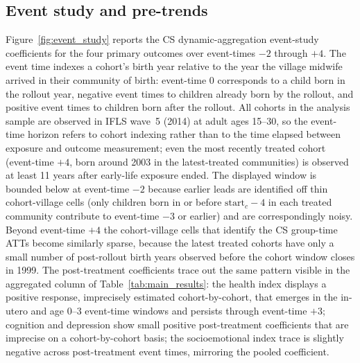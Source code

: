 \subsection{Event study and pre-trends}

Figure~\ref{fig:event_study} reports the CS dynamic-aggregation event-study coefficients for the four primary outcomes over event-times $-2$ through $+4$. The event time indexes a cohort's birth year relative to the year the village midwife arrived in their community of birth: event-time $0$ corresponds to a child born in the rollout year, negative event times to children already born by the rollout, and positive event times to children born after the rollout. All cohorts in the analysis sample are observed in IFLS wave~5 (2014) at adult ages 15--30, so the event-time horizon refers to cohort indexing rather than to the time elapsed between exposure and outcome measurement; even the most recently treated cohort (event-time $+4$, born around 2003 in the latest-treated communities) is observed at least 11 years after early-life exposure ended. The displayed window is bounded below at event-time $-2$ because earlier leads are identified off thin cohort-village cells (only children born in or before $\text{start}_c - 4$ in each treated community contribute to event-time $-3$ or earlier) and are correspondingly noisy. Beyond event-time $+4$ the cohort-village cells that identify the CS group-time ATTs become similarly sparse, because the latest treated cohorts have only a small number of post-rollout birth years observed before the cohort window closes in 1999. The post-treatment coefficients trace out the same pattern visible in the aggregated column of Table~\ref{tab:main_results}: the health index displays a positive response, imprecisely estimated cohort-by-cohort, that emerges in the in-utero and age 0--3 event-time windows and persists through event-time $+3$; cognition and depression show small positive post-treatment coefficients that are imprecise on a cohort-by-cohort basis; the socioemotional index trace is slightly negative across post-treatment event times, mirroring the pooled coefficient.

